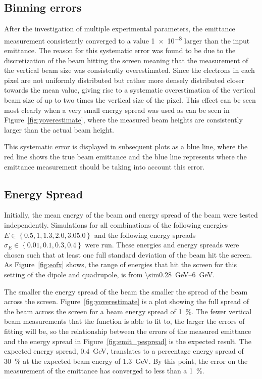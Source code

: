 \subsection{Binning errors}

After the investigation of multiple experimental parameters, the emittance
measurement consistently converged to a value \num{1e-8} larger than the input
emittance. The reason for this systematic error was found to be due to the
discretization of the beam hitting the screen meaning that the measurement of
the vertical beam size was consistently overestimated. Since the electrons in
each pixel are not uniformly distributed but rather more densely distributed
closer towards the mean value, giving rise to a systematic overestimation of the
vertical beam size of up to two times the vertical size of the pixel. This
effect can be seen most clearly when a very small energy spread was used as can
be seen in Figure~\ref{fig:yoverestimate}, where the measured beam heights are
consistently larger than the actual beam height.

This systematic error is displayed in subsequent plots as a blue line, where the
red line shows the true beam emittance and the blue line represents where the
emittance measurement should be taking into account this error.

\subsection{Energy Spread}

Initially, the mean energy of the beam and energy spread of the beam were tested
independently. Simulations for all combinations of the following energies \(E
\in \left\{ 0.5, 1, 1.3, 2.0, 3.0 5.0\right\} \) and the following energy
spreads \(\sigma_E \in \left\{ 0.01, 0.1, 0.3, 0.4 \right\}\) were run.  These
energies and energy spreads were chosen such that at least one full standard
deviation of the beam hit the screen. As Figure~\ref{fig:eofx} shows, the range
of energies that hit the screen for this setting of the dipole and quadrupole,
is from \SIrange{\sim0.28}{6}{\giga\electronvolt}.

The smaller the energy spread of the beam the smaller the spread of the beam
across the screen. Figure~\ref{fig:yoverestimate} is a plot showing the full
spread of the beam across the screen for a beam energy spread of
\SI{1}{\percent}. The fewer vertical beam measurements that the function is able
to fit to, the larger the errors of fitting will be, so the relationship between
the errors of the measured emittance and the energy spread in
Figure~\ref{fig:emit_pespread} is the expected result. The expected energy
spread, \SI{0.4}{\giga\electronvolt}, translates to a percentage energy spread
of \SI{30}{\percent} at the expected beam energy of
\SI{1.3}{\giga\electronvolt}. By this point, the error on the measurement of the
emittance has converged to less than a \SI{1}{\percent}.

